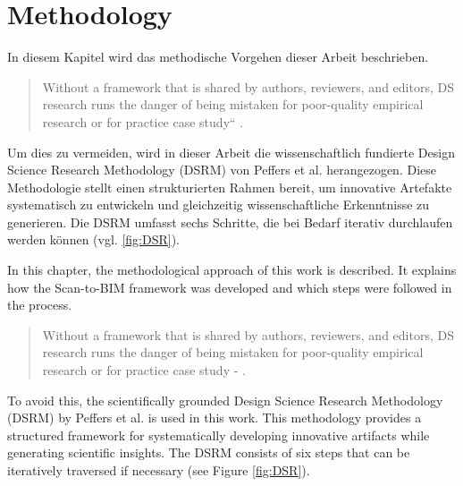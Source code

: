 \chapter{Methodology}
\label{sec:methodology}

\begin{German}
    In diesem Kapitel wird das methodische Vorgehen dieser Arbeit beschrieben.
    
    \begin{quote}
        Without a framework that is shared by authors, reviewers, and editors, DS research runs the danger of being mistaken for poor-quality empirical research or for practice case study“ \textcite{peffersPDFDesignScience2024}.\\
    \end{quote}
    
    Um dies zu vermeiden, wird in dieser Arbeit die wissenschaftlich fundierte Design Science Research Methodology (DSRM) von Peffers et al. \cite{peffersPDFDesignScience2024} herangezogen. Diese Methodologie stellt einen strukturierten Rahmen bereit, um innovative Artefakte systematisch zu entwickeln und gleichzeitig wissenschaftliche Erkenntnisse zu generieren. Die DSRM umfasst sechs Schritte, die bei Bedarf iterativ durchlaufen werden können (vgl. \ref{fig:DSR}).
\end{German}

\begin{English}
    In this chapter, the methodological approach of this work is described. It explains how the Scan-to-BIM framework was developed and which steps were followed in the process.

    \begin{quote}
        Without a framework that is shared by authors, reviewers, and editors, DS research runs the danger of being mistaken for poor-quality empirical research or for practice case study - \textcite{peffersPDFDesignScience2024}.\\
    \end{quote}
    
    To avoid this, the scientifically grounded Design Science Research Methodology (DSRM) by Peffers et al. \cite{peffersPDFDesignScience2024} is used in this work. This methodology provides a structured framework for systematically developing innovative artifacts while generating scientific insights. The DSRM consists of six steps that can be iteratively traversed if necessary (see Figure \ref{fig:DSR}).
\end{English}

